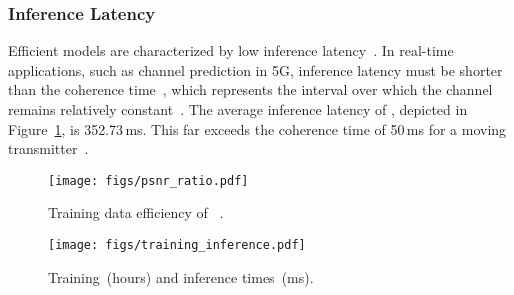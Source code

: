 \subsubsection{Inference Latency}
Efficient models are characterized by low inference latency~\cite{fu2024serverlessllm, wang2024minimizing, zhang2021deepslicing}.
In real-time applications, such as channel prediction in 5G, inference latency must be shorter than the coherence time~\cite{liu2021fire},  
which represents the interval over which the channel remains relatively constant~\cite{liu2021fire}.  
The average inference latency of \nerft, depicted in Figure~\ref{fig_motivation_train_inference}, is 352.73\,ms.
This far exceeds the coherence time of 50\,ms for a moving transmitter~\cite{marzetta2016fundamentals}.


\begin{figure}[t]
	\begin{minipage}[t]{0.48\linewidth} 
    	\texttt{[image: figs/psnr\_ratio.pdf]}
\caption{Training data efficiency of \nerft~\cite{zhao2023nerf}.}
        \label{fig_motivation_data}
	\end{minipage}
 \hspace{0.04in}
 	\begin{minipage}[t]{0.48\linewidth} 
    	\texttt{[image: figs/training\_inference.pdf]}
\caption{Training~(hours) and inference times~(ms).}
        \label{fig_motivation_train_inference}
	\end{minipage}
 \Description[]{}
\end{figure}



